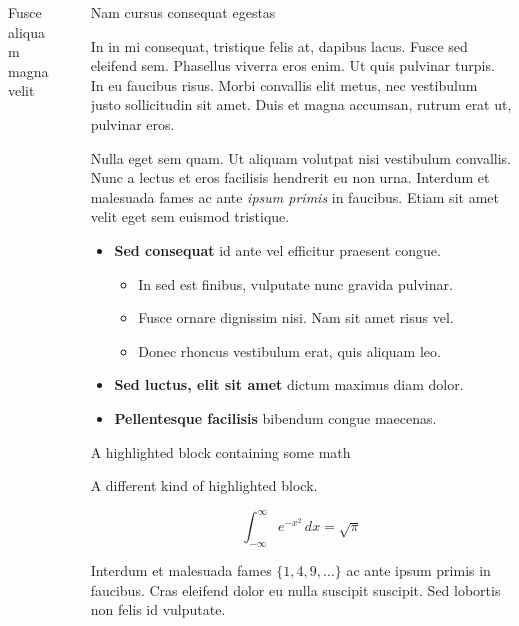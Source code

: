 \documentclass[final]{beamer}
\newlength{\sepwidth}
\newlength{\colwidth}
\newcommand{\separatorcolumn}{\begin{column}{\sepwidth}\end{column}}
\begin{document}
\begin{frame}[t]
\begin{columns}[t]
\begin{column}{\colwidth}
\begin{block}{Fusce aliquam magna velit}
  \end{block}

\end{column}

\separatorcolumn

\begin{column}{\colwidth}

  \begin{block}{Nam cursus consequat egestas}

    In in mi consequat, tristique felis at, dapibus lacus. Fusce sed eleifend
    sem. Phasellus viverra eros enim. Ut quis pulvinar turpis. In eu faucibus
    risus. Morbi convallis elit metus, nec vestibulum justo sollicitudin sit
    amet. Duis et magna accumsan, rutrum erat ut, pulvinar eros.

    Nulla eget sem quam. Ut aliquam volutpat nisi vestibulum convallis. Nunc a
    lectus et eros facilisis hendrerit eu non urna. Interdum et malesuada fames
    ac ante \textit{ipsum primis} in faucibus. Etiam sit amet velit eget sem
    euismod tristique.

    \begin{itemize}
      \item \textbf{Sed consequat} id ante vel efficitur praesent congue.
        \begin{itemize}
          \item In sed est finibus, vulputate nunc gravida pulvinar.
          \item Fusce ornare dignissim nisi. Nam sit amet risus vel.
          \item Donec rhoncus vestibulum erat, quis aliquam leo.
        \end{itemize}
      \item \textbf{Sed luctus, elit sit amet} dictum maximus diam dolor.
      \item \textbf{Pellentesque facilisis} bibendum congue maecenas.
    \end{itemize}

  \end{block}

  \begin{blueblock}{A highlighted block containing some math}

    A different kind of highlighted block.

    $$
    \int_{-\infty}^{\infty} e^{-x^2}\,dx = \sqrt{\pi}
    $$

    Interdum et malesuada fames $\{1, 4, 9, \ldots\}$ ac ante ipsum primis in
    faucibus. Cras eleifend dolor eu nulla suscipit suscipit. Sed lobortis non
    felis id vulputate.


\end{blueblock}
\end{column}
\end{columns}
\end{frame}
\end{document}

